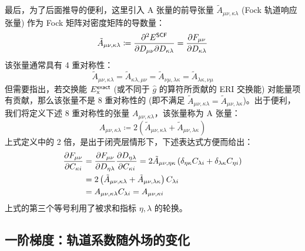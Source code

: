最后，为了后面推导的便利，这里引入 A 张量的前导张量 $\tilde A_{\mu \nu, \kappa \lambda}$ (Fock 轨道响应张量) 作为 Fock 矩阵对密度矩阵的导数量：
\begin{equation}
    \label{eq.3.def.Auvkl-pre}
    \tilde A_{\mu \nu, \kappa \lambda} \coloneq \frac{\partial^2 E^{\textsf{SCF}}}{\partial D_{\mu \nu} \partial D_{\kappa \lambda}} = \frac{\partial F_{\mu \nu}}{\partial D_{\kappa \lambda}}
\end{equation}
该张量通常具有 4 重对称性：
\begin{equation*}
    \tilde A_{\mu \nu, \kappa \lambda} = \tilde A_{\kappa \lambda, \mu \nu} = \tilde A_{\nu \mu, \lambda \kappa} = \tilde A_{\lambda \kappa, \nu \mu}
\end{equation*}
但需要指出，若交换能 $E_\mathrm{x}^{\textsf{exact}}$ (或不同于 $\hat g$ 的算符所贡献的 ERI 交换能) 对能量项有贡献，那么该张量不是 8 重对称性的 (即不满足 $\tilde A_{\mu \nu, \kappa \lambda} = \tilde A_{\mu \nu, \lambda \kappa}$)。出于便利，我们将定义下述 8 重对称性的张量 $A_{\mu \nu, \kappa \lambda}$，该张量称为 A 张量：
\begin{equation}
    \label{eq.3.def.Auvkl}
    A_{\mu \nu, \kappa \lambda} \coloneq 2 \left( \tilde A_{\mu \nu, \kappa \lambda} + \tilde A_{\mu \nu, \lambda \kappa} \right)
\end{equation}
上式定义中的 2 倍，是出于闭壳层情形下，下述表达式方便而给出：
\begin{align}
    \frac{\partial F_{\mu \nu}}{\partial C_{\kappa i}} &= \frac{\partial F_{\mu \nu}}{\partial D_{\eta \lambda}} \frac{\partial D_{\eta \lambda}}{\partial C_{\kappa i}}
    = 2 \tilde A_{\mu \nu, \eta \kappa} \left( \delta_{\eta \kappa} C_{\lambda i} + \delta_{\lambda \kappa} C_{\eta i} \right) \notag\\
    &= 2 \left( \tilde A_{\mu \nu, \kappa \lambda} + \tilde A_{\mu \nu, \lambda \kappa} \right) C_{\lambda i} \notag\\
    &= A_{\mu \nu, \kappa \lambda} C_{\lambda i} = A_{\mu \nu, \kappa i}
\end{align}
上式的第三个等号利用了被求和指标 $\eta, \lambda$ 的轮换。

\subsection{一阶梯度：轨道系数随外场的变化}

